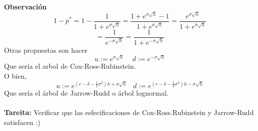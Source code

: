 \documentclass[12pts]{extarticle}
\begin{document}
\textbf{Observación} 
$$1-p^{*}=1-\frac{1}{1+e^{\sigma \sqrt{h}}}=\frac{1+e^{\sigma \sqrt{h}}-1}{1+e^{\sigma \sqrt{h}}}=\frac{e^{\sigma \sqrt{h}}}{1+e^{\sigma \sqrt{h}}}$$
$$=\frac{1}{e^{-\sigma \sqrt{h}}}=\frac{1}{1+e^{-\sigma \sqrt{h}}}$$
Otras propuestas son hacer
$$u:=e^{\sigma \sqrt{h}} \, \, \, \, \, \, \, d:=e^{-\sigma \sqrt{h}}$$
Que sería el arbol de Cox-Ross-Rubinstein.\\
O bien,
$$u:=e^{(r-\delta -\frac{1}{2}\sigma^2)h+\sigma \sqrt{h}} \, \, \, \, \, d:=e^{(r-\delta -\frac{1}{2}\sigma^2)h-\sigma \sqrt{h}}$$
Que sería el árbol de Jarrow-Rudd o árbol lognormal. 
\\ \\
\textbf{Tareita:} Verificar que las esfecificaciones de Cox-Ross.Rubinstein y Jarrow-Rudd satisfacen :)
\end{document}
